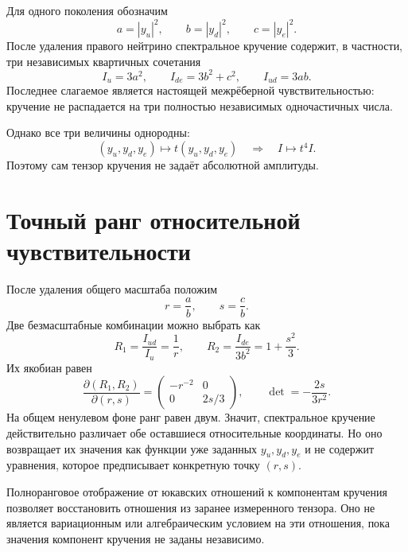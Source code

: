 Для одного поколения обозначим
\begin{equation}
 a=|y_u|^2,\qquad b=|y_d|^2,\qquad c=|y_e|^2.
\end{equation}
После удаления правого нейтрино спектральное кручение содержит, в частности,
три независимых квартичных сочетания
\begin{equation}
 I_u=3a^2,\qquad
 I_{de}=3b^2+c^2,\qquad
 I_{ud}=3ab.
 \label{eq:v5-h15-torsion-invariants}
\end{equation}
Последнее слагаемое является настоящей межрёберной чувствительностью:
кручение не распадается на три полностью независимых одночастичных числа.

Однако все три величины однородны:
\begin{equation}
 (y_u,y_d,y_e)\longmapsto
 t(y_u,y_d,y_e)
 \quad\Longrightarrow\quad
 I\longmapsto t^4I.
\end{equation}
Поэтому сам тензор кручения не задаёт абсолютной амплитуды.

\section{Точный ранг относительной чувствительности}

После удаления общего масштаба положим
\begin{equation}
 r=\frac{a}{b},\qquad s=\frac{c}{b}.
\end{equation}
Две безмасштабные комбинации можно выбрать как
\begin{equation}
 R_1=\frac{I_{ud}}{I_u}=\frac1r,
 \qquad
 R_2=\frac{I_{de}}{3b^2}=1+\frac{s^2}{3}.
\end{equation}
Их якобиан равен
\begin{equation}
 \frac{\partial(R_1,R_2)}{\partial(r,s)}
 =
 \begin{pmatrix}
 -r^{-2}&0\\
 0&2s/3
 \end{pmatrix},
 \qquad
 \det=-\frac{2s}{3r^2}.
 \label{eq:v5-h15-torsion-relative-jacobian}
\end{equation}
На общем ненулевом фоне ранг равен двум. Значит, спектральное кручение
действительно различает обе оставшиеся относительные координаты. Но оно
возвращает их значения как функции уже заданных $y_u,y_d,y_e$ и не содержит
уравнения, которое предписывает конкретную точку $(r,s)$.

\begin{proposition}
Полноранговое отображение от юкавских отношений к компонентам кручения
позволяет восстановить отношения из заранее измеренного тензора. Оно не
является вариационным или алгебраическим условием на эти отношения, пока
значения компонент кручения не заданы независимо.
\end{proposition}

